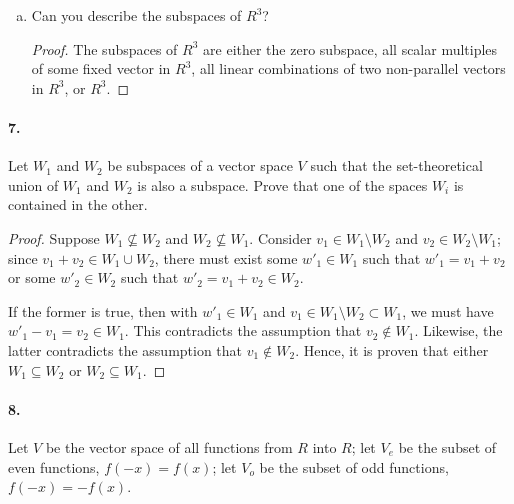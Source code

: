 \documentclass{article}
\begin{document}
\begin{enumerate}[(a)]
\begin{proof}
      From \textbf{Theorem 1.13}, any vector $v \in R^2$ can be rewritten
      into $v = A\begin{bmatrix}
        e \\
        f
      \end{bmatrix} = ev_1 + fv_2$ for $e, f \in R$. Hence, $V = R^2$ if there
      exist two non-zero vectors $v_1, v_2 \in R^2$ which are not scalar
      multiples of each other.
    \end{proof}
  \item Can you describe the subspaces of $R^3$?

    \begin{proof}
      The subspaces of $R^3$ are either the zero subspace, all scalar multiples
      of some fixed vector in $R^3$, all linear combinations of two non-parallel
      vectors in $R^3$, or $R^3$.
    \end{proof}
\end{enumerate}

\paragraph{7.} Let $W_1$ and $W_2$ be subspaces of a vector space $V$ such that
the set-theoretical union of $W_1$ and $W_2$ is also a subspace. Prove that one
of the spaces $W_i$ is contained in the other.

\begin{proof}
  Suppose $W_1 \not\subseteq W_2$ and $W_2 \not\subseteq W_1$. Consider $v_1 \in
  W_1 \setminus W_2$ and $v_2 \in W_2 \setminus W_1$; since $v_1 + v_2 \in W_1
  \cup W_2$, there must exist some $w'_1 \in W_1$ such that $w'_1 = v_1 + v_2$
  or some $w'_2 \in W_2$ such that $w'_2 = v_1 + v_2 \in W_2$.

  If the former is true, then with $w'_1 \in W_1$ and $v_1 \in W_1 \setminus W_2
  \subset W_1$, we must have $w'_1 - v_1 = v_2 \in W_1$. This contradicts the
  assumption that $v_2 \not\in W_1$. Likewise, the latter contradicts the
  assumption that $v_1 \not\in W_2$. Hence, it is proven that either $W_1
  \subseteq W_2$ or $W_2 \subseteq W_1$.
\end{proof}

\paragraph{8.} Let $V$ be the vector space of all functions from $R$ into $R$;
let $V_e$ be the subset of even functions, $f(-x) = f(x)$; let $V_o$ be the
subset of odd functions, $f(-x) = -f(x)$.
\end{document}

